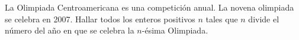 La Olimpiada Centroamericana es una competición anual. La novena olimpiada se celebra en 2007. Hallar todos los enteros positivos $n$ tales que $n$ divide el número del año en que se celebra la $n$-ésima Olimpiada.
